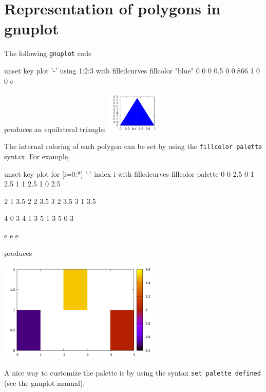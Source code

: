 \documentclass{article}
\begin{document}
\clearpage
\appendix

\section{Representation of polygons in gnuplot}
\label{sec:gnuplot}

The
following \texttt{gnuplot} code
\begin{code}
  unset key
  plot '-' using 1:2:3 with filledcurves fillcolor "blue"
  0 0 0
  0.5 0 0.866
  1 0 0
  e
\end{code}
produces an equilateral triangle: \includegraphics[height=2cm]{triangle}

\medskip

The internal coloring of each polygon can be set by using the
\texttt{fillcolor palette} syntax. For example,
\begin{scriptsize}
\begin{code}
unset key
plot for [i=0:*] '-' index i with filledcurves fillcolor palette
	0 0 2.5
	0 1 2.5
	1 1 2.5
	1 0 2.5

	2 1 3.5
	2 2 3.5
	3 2 3.5
	3 1 3.5

	4 0 3
	4 1 3
	5 1 3
	5 0 3

e
e
e
\end{code}
\end{scriptsize}
produces
\begin{center}
  \includegraphics[width=0.6\textwidth]{squares}
\end{center}

A nice way to customize the palette is by using the syntax \texttt{set
palette defined} (see the gnuplot manual).
\end{document}
